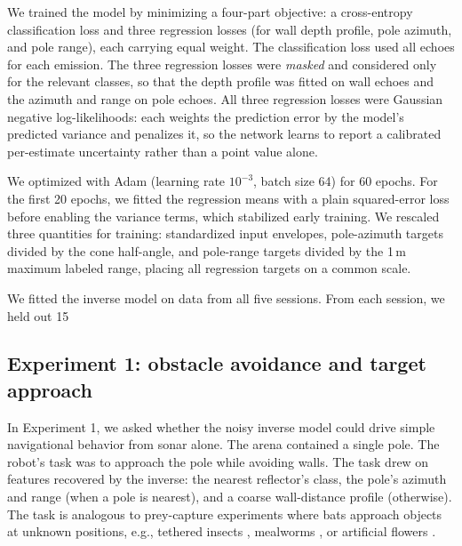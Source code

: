 \documentclass[11pt]{article}
\begin{document}
We trained the model by minimizing a four-part objective: a cross-entropy classification loss and three regression losses (for wall depth profile, pole azimuth, and pole range), each carrying equal weight. The classification loss used all echoes for each emission. The three regression losses were \emph{masked} and considered only for the relevant classes, so that the depth profile was fitted on wall echoes and the azimuth and range on pole echoes. All three regression losses were Gaussian negative log-likelihoods: each weights the prediction error by the model's predicted variance and penalizes it, so the network learns to report a calibrated per-estimate uncertainty rather than a point value alone.

We optimized with Adam (learning rate $10^{-3}$, batch size 64) for 60 epochs. For the first 20 epochs, we fitted the regression means with a plain squared-error loss before enabling the variance terms, which stabilized early training. We rescaled three quantities for training: standardized input envelopes, pole-azimuth targets divided by the cone half-angle, and pole-range targets divided by the 1\,m maximum labeled range, placing all regression targets on a common scale.


We fitted the inverse model on data from all five sessions. From each session, we held out 15%

\subsection{Experiment 1: obstacle avoidance and target approach}


In Experiment 1, we asked whether the noisy inverse model could drive simple navigational behavior from sonar alone. The arena contained a single pole. The robot's task was to approach the pole while avoiding walls. The task drew on features recovered by the inverse: the nearest reflector's class, the pole's azimuth and range (when a pole is nearest), and a coarse wall-distance profile (otherwise). The task is analogous to prey-capture experiments where bats approach objects at unknown positions, e.g., tethered insects \citep{Ghose2003}, mealworms \citep{Falk2014}, or artificial flowers \citep{Simon2011}.
\end{document}
